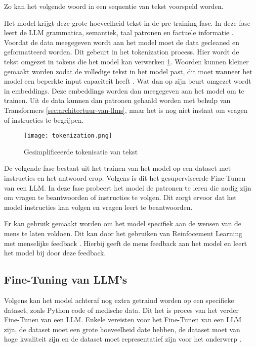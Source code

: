 Zo kan het volgende woord in een sequentie van tekst voorspeld worden.

Het model krijgt deze grote hoeveelheid tekst in de pre-training fase.
In deze fase leert de LLM grammatica, semantiek, taal patronen en factuele informatie \autocite{Cacic2023}.
Voordat de data meegegeven wordt aan het model moet de data gecleaned en geformatteerd worden.
Dit gebeurt in het tokenization process. Hier wordt de tekst omgezet in tokens die het model kan verwerken \ref{fig:tokenization}.
Woorden kunnen kleiner gemaakt worden zodat de volledige tekst in het model past, dit moet wanneer het model een beperkte input capaciteit heeft \autocite{ElHousieny2023}.
Wat dan op zijn beurt omgezet wordt in embeddings. Deze embeddings worden dan meegegeven aan het model om te trainen.
Uit de data kunnen dan patronen gehaald worden met behulp van Transformers \ref{sec:architectuur-van-llms}, maar het is nog niet instaat om vragen of instructies te begrijpen.

\begin{figure}[h]
  \centering
  \texttt{[image: tokenization.png]}
  \caption[Tokenisatie van tekst]{Gesimplificeerde tokenisatie van tekst \autocite{TeeTracker2023}}
  \label{fig:tokenization}
\end{figure}

De volgende fase bestaat uit het trainen van het model op een dataset met instructies en het antwoord erop. 
Volgens \textcite{Das2024} is dit het gesuperviseerde Fine-Tunen van een LLM.
In deze fase probeert het model de patronen te leren die nodig zijn om vragen te beantwoorden of instructies te volgen.
Dit zorgt ervoor dat het model instructies kan volgen en vragen leert te beantwoorden.

Er kan gebruik gemaakt worden om het model specifiek aan de wensen van de mens te laten voldoen. Dit kan door het gebruiken van Reinfocement Learning met menselijke feedback \autocite{LambertEtAL2022}. 
Hierbij geeft de mens feedback aan het model en leert het model bij door deze feedback.

\subsection{Fine-Tuning van LLM's}
\label{sec:fine-tuning-van-llms}

Volgens \textcite{Peckham2024} kan het model achteraf nog extra getraind worden op een specifieke dataset,  zoals Python code of medische data.
Dit het is proces van het verder Fine-Tunen van een LLM.
Enkele vereisten voor het Fine-Tunen van een LLM zijn, de dataset moet een grote hoeveelheid date hebben, de dataset moet van hoge kwaliteit zijn en de dataset moet representatief zijn voor het onderwerp \autocite{Peckham2024}.

